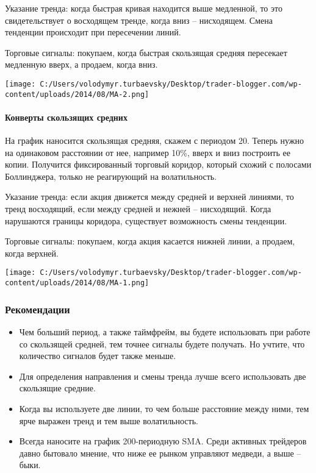 \documentclass[a5paper]{article}
\begin{document}
Указание тренда: когда быстрая кривая находится выше медленной, то это свидетельствует о восходящем тренде, когда вниз – нисходящем. Смена тенденции происходит при пересечении линий.

Торговые сигналы: покупаем, когда быстрая скользящая средняя пересекает медленную вверх, а продаем, когда вниз.

\texttt{[image: C:/Users/volodymyr.turbaevsky/Desktop/trader-blogger.com/wp-content/uploads/2014/08/MA-2.png]}

\paragraph{Конверты скользящих средних}

На график наносится скользящая средняя, скажем с периодом 20. Теперь нужно на одинаковом расстоянии от нее, например 10\%, вверх и вниз построить ее копии. Получится фиксированный торговый коридор, который схожий с полосами Боллинджера, только не реагирующий на волатильность.

Указание тренда: если акция движется между средней и верхней линиями, то тренд восходящий, если между средней и нежней – нисходящий. Когда нарушаются границы коридора, существует возможность смены тенденции.

Торговые сигналы: покупаем, когда акция касается нижней линии, а
продаем, когда верхней.

\texttt{[image: C:/Users/volodymyr.turbaevsky/Desktop/trader-blogger.com/wp-content/uploads/2014/08/MA-1.png]}

\subsubsection{Рекомендации}
\begin{itemize}
\item     Чем больший период, а также таймфрейм, вы будете использовать при работе со скользящей средней, тем точнее сигналы будете получать. Но учтите, что количество сигналов будет также меньше.
\item     Для определения направления и смены тренда лучше всего использовать две скользящие средние.
\item     Когда вы используете две линии, то чем больше расстояние между ними, тем ярче выражен тренд и тем выше волатильность.
\item     Всегда наносите на график 200-периодную SMA. Среди активных трейдеров давно бытовало мнение, что ниже ее рынком управляют медведи, а выше – быки.
\end{itemize}
\end{document}
